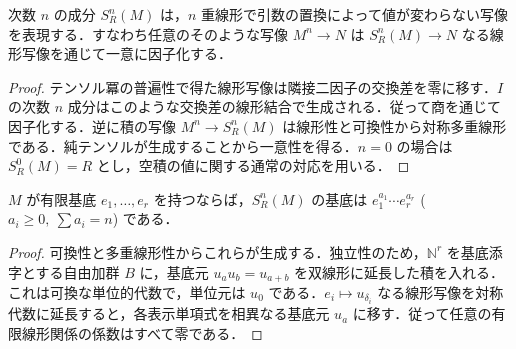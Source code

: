 \begin{prop}[対称冪の普遍性]
次数 $n$ の成分 $S_R^n(M)$ は，$n$ 重線形で引数の置換によって値が変わらない写像を表現する．すなわち任意のそのような写像 $M^n\to N$ は $S_R^n(M)\to N$ なる線形写像を通じて一意に因子化する．
\end{prop}
\begin{proof}
テンソル冪の普遍性で得た線形写像は隣接二因子の交換差を零に移す．$I$ の次数 $n$ 成分はこのような交換差の線形結合で生成される．従って商を通じて因子化する．逆に積の写像 $M^n\to S_R^n(M)$ は線形性と可換性から対称多重線形である．純テンソルが生成することから一意性を得る．$n=0$ の場合は $S_R^0(M)=R$ とし，空積の値に関する通常の対応を用いる．
\end{proof}
\begin{prop}[自由加群の対称冪の基底]
$M$ が有限基底 $e_1,\ldots,e_r$ を持つならば，$S_R^n(M)$ の基底は $e_1^{a_1}\cdots e_r^{a_r}$ ($a_i\geq0,\ \sum a_i=n$) である．
\end{prop}
\begin{proof}
可換性と多重線形性からこれらが生成する．独立性のため，$\mathbb N^r$ を基底添字とする自由加群 $B$ に，基底元 $u_a u_b=u_{a+b}$ を双線形に延長した積を入れる．これは可換な単位的代数で，単位元は $u_0$ である．$e_i\mapsto u_{\delta_i}$ なる線形写像を対称代数に延長すると，各表示単項式を相異なる基底元 $u_a$ に移す．従って任意の有限線形関係の係数はすべて零である．
\end{proof}
